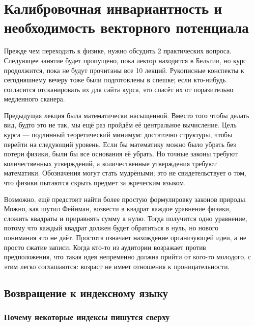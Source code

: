 \chapter{Калибровочная инвариантность и необходимость векторного потенциала}

Прежде чем переходить к физике, нужно обсудить 2 практических вопроса. Следующее занятие будет пропущено, пока лектор находится в Бельгии, но курс продолжится, пока не будут прочитаны все 10 лекций. Рукописные конспекты к сегодняшнему вечеру тоже были подготовлены в спешке; если кто-нибудь согласится отсканировать их для сайта курса, это спасёт их от поразительно медленного сканера.

Предыдущая лекция была математически насыщенной. Вместо того чтобы делать вид, будто это не так, мы ещё раз пройдём её центральное вычисление. Цель курса — подлинный теоретический минимум: достаточно структуры, чтобы перейти на следующий уровень. Если бы математику можно было убрать без потери физики, были бы все основания её убрать. Но точные законы требуют количественных утверждений, а количественные утверждения требуют математики. Обозначения могут стать мудрёными; это не свидетельствует о том, что физики пытаются скрыть предмет за жреческим языком.

Возможно, ещё предстоит найти более простую формулировку законов природы. Можно, как шутил Фейнман, возвести в квадрат каждое уравнение физики, сложить квадраты и приравнять сумму к нулю. Тогда получится одно уравнение, потому что каждый квадрат должен будет обратиться в нуль, но нового понимания это не даёт. Простота означает нахождение организующей идеи, а не просто сжатие записи. Когда кто-то из аудитории возражает против предположения, что такая идея непременно должна прийти от кого-то молодого, с этим легко соглашаются: возраст не имеет отношения к проницательности.


\section{Возвращение к индексному языку}

\subsection{Почему некоторые индексы пишутся сверху}

